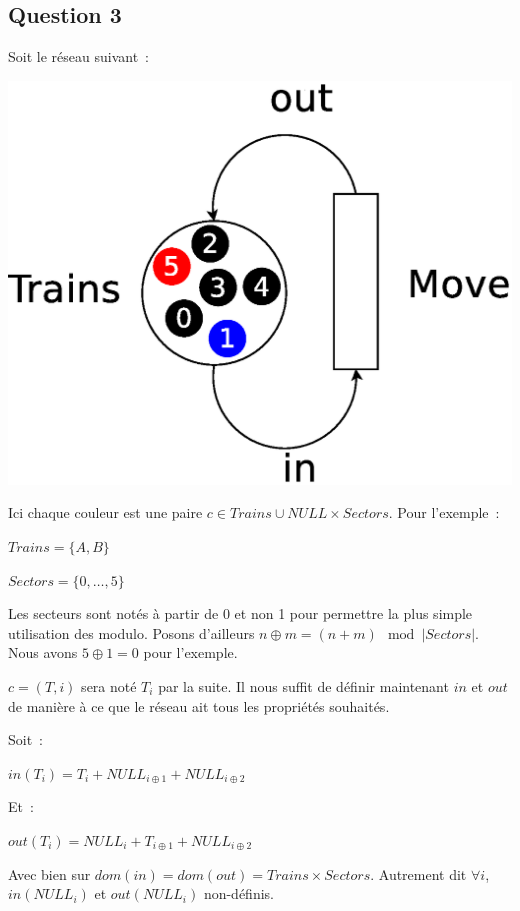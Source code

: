 \subsection*{Question 3}

Soit le réseau suivant~:

\begin{center}
\includegraphics[height = 0.4\paperwidth]{exo8_coloured_3.eps}
\end{center}

Ici chaque couleur est une paire $c \in Trains \cup NULL \times Sectors$. 
Pour l'exemple~:

$Trains = \{ A, B\}$

$Sectors = \{0, \ldots{}, 5\}$

Les secteurs sont notés à partir de 0 et non 1 pour permettre la plus simple 
utilisation des modulo. 
Posons d'ailleurs $n\oplus{m} = (n+m)\mod{\left|Sectors\right|}$. 
Nous avons $5\oplus{1} = 0$ pour l'exemple.

$c = (T, i)$ sera noté $T_i$ par la suite. Il nous suffit de définir maintenant 
$in$ et $out$ de manière à ce que le réseau ait tous les propriétés souhaités.

Soit~:

$in(T_i) = T_{i} + NULL_{i\oplus{1}} + NULL_{i\oplus{2}}$

Et~:

$out(T_i) = NULL_{i} + T_{i\oplus{1}} + NULL_{i\oplus{2}}$

Avec bien sur $dom(in) = dom(out) = Trains \times Sectors$. Autrement dit 
$\forall i$, $in(NULL_i)$ et $out(NULL_i)$ non-définis.
